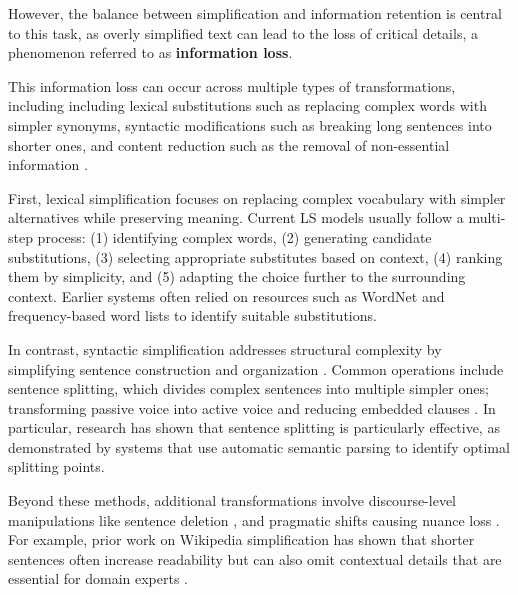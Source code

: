\documentclass{DESSThesis}
\begin{document}
However, the balance between simplification and information retention is central to this task, as overly simplified text can lead to the loss of critical details, a phenomenon referred to as \textbf{information loss}\cite{trienes2024infolossqacharacterizingrecoveringinformation}. 

This information loss can occur across multiple types of transformations, including including lexical substitutions such as replacing complex words with simpler synonyms\cite{saggion2017automatic}, syntactic modifications such as breaking long sentences into shorter ones\cite{saggion2017automatic}, and content reduction such as the removal of non-essential information \cite{Zhong_Jiang_Xu_Li_2020}.

First, lexical simplification focuses on replacing complex vocabulary with simpler alternatives while preserving meaning\cite{shardlow2014survey}. Current LS models usually follow a multi-step process: (1) identifying complex words, (2) generating candidate substitutions, (3) selecting appropriate substitutes based on context, (4) ranking them by simplicity, and (5) adapting the choice further to the surrounding context\cite{saggion2023findingstsar2022sharedtask}. Earlier systems often relied on resources such as WordNet and frequency-based word lists to identify suitable substitutions\cite{carroll1998practical,swain2019lexical, truicua2023simplex}. 

In contrast, syntactic simplification addresses structural complexity by simplifying sentence construction and organization \cite{GRUBISIC2022115900,gooding2022ethical}. Common operations include sentence splitting, which divides complex sentences into multiple simpler ones; transforming passive voice into active voice and reducing embedded clauses \cite{siddharthan2006syntactic}. In particular, research has shown that sentence splitting is particularly effective, as demonstrated by systems that use automatic semantic parsing to identify optimal splitting points\cite{sulem-etal-2018-simple}. 

Beyond these methods, additional transformations involve discourse-level manipulations like sentence deletion \cite{Zhong_Jiang_Xu_Li_2020}, and pragmatic shifts causing nuance loss \cite{trienes2024infolossqacharacterizingrecoveringinformation}. For example, prior work on Wikipedia simplification has shown that shorter sentences often increase readability but can also omit contextual details that are essential for domain experts \cite{yasseri2012practical, martínez2024exploringlargelanguagemodels}.
\end{document}
